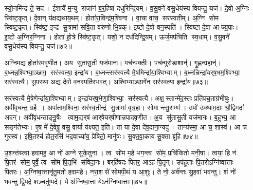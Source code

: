 स्यो॒नमि॑न्द्र ते॒ सद॑।
ई॒शायै॑ म॒न्यु राजा॑नं ब॒र्॒हिषा॑ दधुरिन्द्रि॒यम्।
व॒सु॒वने॑ वसु॒धेय॑स्य वियन्तु॒ यज॑।
दे॒वो अ॒ग्निः स्वि॑ष्ट॒कृत्।
दे॒वान् य॑क्षद्यथाय॒थम्।
होता॑रा॒विन्द्र॑म॒श्विना।
वा॒चा वाच॒ सर॑स्वतीम्।
अ॒ग्नि सोम स्विष्ट॒कृत्।
स्वि॑ष्ट॒ इन्द्र॑ सु॒त्रामा॑ सवि॒ता वरु॑णो भि॒षक्।
इ॒ष्टो दे॒वो वन॒स्पति॑।
स्वि॑ष्टा दे॒वा आज्य॒पाः।
इ॒ष्टो अ॒ग्निर॒ग्निना।
होता॑ हो॒त्रे स्वि॑ष्ट॒कृत्।
यशो॒ न दध॑दिन्द्रि॒यम्।
ऊर्ज॒मप॑चिति स्व॒धाम्।
व॒सु॒वने॑ वसु॒धेय॑स्य वियन्तु॒ यज॑॥७२॥\anuvakamend[द्वारो॑ दधुरिन्द्रि॒यं व॑सु॒वने॑ वसु॒धेय॑स्य वियन्तु॒ यज॒ जोष्ट्रीभ्यान्दधुरिन्द्रि॒यं व॑सु॒वने॑ वसु॒धेय॑स्य वियन्तु॒ यज॒ होतृ॑भ्यान्दधुरिन्द्रि॒यं व॑सु॒वने॑ वसु॒धेय॑स्य वियन्तु॒ यजेन्द्रि॒याणि॑ वसु॒वने॑ वसु॒धेय॑स्य वियन्तु॒ यज॒ सर॑स्वत्या॒ वन॒स्पति॒ष्षट्च॑ (दे॒वं ब॒र्॒हिर्दे॒वीर्द्वारो॑ दे॒वी उ॒षासा॑व॒श्विना॑ दे॒वी जोष्ट्री॑ दे॒वी ऊ॒र्जाहु॑ती दे॒वा दे॒वानां भि॒षजा॑ वषट्का॒रैर्दे॒वीस्ति॒स्रस्ति॒स्रो दे॒वीर्दे॒व इन्द्रो॒ नरा॒शसो॑ दे॒व इन्द्रो॒ वन॒स्पति॑र्दे॒वं ब॒र्॒हिर्वारि॑तीनान्दे॒वो अ॒ग्निः स्वि॑ष्ट॒कृद्दे॒वान्।
स॒मिधा॒ऽग्निन्दे॒वं ब॒र्॒हिः सर॑स्वत्य॒श्विना॒ सर्व॑ वियन्तु।
द्वार॑स्ति॒स्रः सर्व॑वियन्तु।
अ॒ज इन्द्र॒मोजो॒ऽग्निं पर॒ सर॑स्वतीम्।
नक्तं॒ पूर्व॒ सर॑स्वति।
अ॒न्यत्र॒ सर॑स्वती।
भि॒षक्पूर्व॑न्दुह इन्द्रि॒यम्।
अ॒न्यत्र॑ दधुरिन्द्रि॒यम्।
सौ॒त्रा॒म॒ण्या सु॑तासु॒ती।
अ॒ञ्जन्त्य॒यं यज॑मानः ॥ )]

अ॒ग्निम॒द्य होता॑रमवृणीत।
अ॒य सु॑तासु॒ती यज॑मानः।
पच॑न्प॒क्तीः।
पच॑न्पुरो॒डाशान्॑।
गृ॒ह्णन्ग्रहान्॑।
ब॒ध्नन्न॒श्विभ्या॒ञ्छाग॒ सर॑स्वत्या॒ इन्द्रा॑य।
ब॒ध्नन्त्सर॑स्वत्यै मे॒षमिन्द्रा॑या॒श्विभ्याम्।
ब॒ध्नन्निन्द्रा॑यर्‌ष॒भम॒श्विभ्या॒ सर॑स्वत्यै।
सू॒प॒स्था अ॒द्य दे॒वो वन॒स्पति॑रभवत्।
अ॒श्विभ्या॒ञ्छागे॑न॒ सर॑स्वत्या॒ इन्द्रा॑य॥७३॥

सर॑स्वत्यै मे॒षेणेन्द्रा॑या॒श्विभ्याम्।
इन्द्रा॑यर्‌ष॒भेणा॒श्विभ्या॒ सर॑स्वत्यै।
अक्ष॒स्तान्मे॑द॒स्तः प्रति॑पच॒ताग्र॑भीषुः।
अवी॑वृधन्त॒ ग्रहै।
अपा॑ताम॒श्विना॒ सर॑स्व॒तीन्द्र॑ सु॒त्रामा॑ वृत्र॒हा।
सोमान्त्सु॒राम्ण॑।
उपो॑ उक्थाम॒दाः श्रौ॒द्विमदा॑ अदन्।
अवी॑वृधन्ताङ्गू॒षैः।
त्वाम॒द्यर्‌ष॑ आर्‌षेयर्‌षीणान्नपादवृणीत।
अ॒य सु॑तासु॒ती यज॑मानः।
ब॒हुभ्य॒ आ सङ्ग॑तेभ्यः।
ए॒ष मे॑ दे॒वेषु॒ वसु॒ वार्या य॑क्ष्यत॒ इति॑।
ता या दे॒वा दे॑व॒दाना॒न्यदु॑।
तान्य॑स्मा॒ आ च॒ शास्व॑।
आ च॑ गुरस्व।
इ॒षि॒तश्च॑ होत॒रसि॑ भद्र॒वाच्या॑य॒ प्रेषि॑तो॒ मानु॑षः।
सू॒क्त॒वा॒काय॑ सू॒क्ता ब्रू॑हि॥७४॥\anuvakamend[इन्द्रा॑य॒ यज॑मानः स॒प्त च॑]

उ॒शन्त॑स्त्वा हवामह॒ आ नो॑ अग्ने सुके॒तुना।
त्व सो॑म म॒हे भग॒न्त्व सो॑म॒ प्रचि॑कितो मनी॒षा।
त्वया॒ हि न॑ पि॒तर॑ सोम॒ पूर्वे॒ त्व सो॑म पि॒तृभि॑ संविदा॒नः।
बर्‌हि॑षदः पितर॒ आऽहं पि॒तॄन्।
उप॑हूताः पि॒तरोऽग्नि॑ष्वात्ताः पितरः।
अ॒ग्निष्वा॒त्तानृ॑तु॒मतो॑ हवामहे।
नरा॒शसे॑ सोमपी॒थं य आ॒शुः।
ते नो॒ अर्व॑न्तः सु॒हवा॑ भवन्तु।
शं नो॑ भवन्तु द्वि॒पदे॒ शञ्चतु॑ष्पदे।
ये अ॑ग्निष्वा॒त्ता येऽन॑ग्निष्वात्ताः॥७५॥

